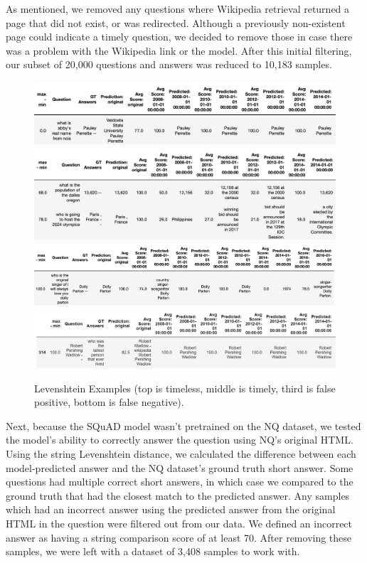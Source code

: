 \documentclass{article}
\begin{document}
As mentioned, we removed any questions where Wikipedia retrieval returned a page
that did not exist, or was redirected. Although a previously non-existent page
could indicate a timely question, we decided to remove those in case there was
a problem with the Wikipedia link or the model. After this initial filtering,
our subset of 20,000 questions and answers was reduced to 10,183 samples.
\begin{figure}[ht]
    \begin{center}
        \includegraphics[width=5in]{timeless leven.png}
        \includegraphics[width=5in]{timely leven.png}
        \includegraphics[width=5in]{leven false pos.png}
        \includegraphics[width=5in]{leven_false_neg.PNG}
	\end{center}
  \caption{Levenshtein Examples (top is timeless, middle is timely, third is false positive, bottom is false negative).}
  \label{fig:levenshtein_examples}
\end{figure}

Next, because the SQuAD model wasn't pretrained on the NQ dataset, we tested the
model's ability to correctly answer the question using NQ's original HTML. Using
the string Levenshtein distance, we calculated the difference between each
model-predicted answer and the NQ dataset's ground truth short answer. Some
questions had multiple correct short answers, in which case we compared to the
ground truth that had the closest match to the predicted answer. Any samples
which had an incorrect answer using the predicted answer from the original HTML
in the question were filtered out from our data. We defined an incorrect answer
as having a string comparison score of at least 70. After removing these
samples, we were left with a dataset of 3,408 samples to work with. 
\end{document}
